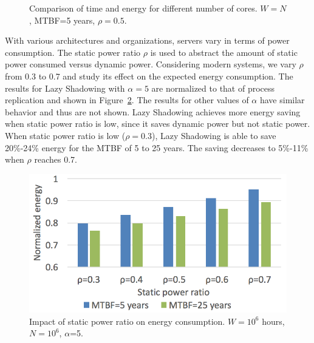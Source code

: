 \begin{figure}[!t]
	\captionsetup{justification=centering}
	\begin{center}
	\end{center}
	\caption{Comparison of time and energy for different number of cores. $W=N$, MTBF=5 years, $\rho=0.5$.}
	\label{fig:n5}
\end{figure}

With various architectures and organizations, servers
vary in terms of
power consumption. The static power ratio $\rho$ is used to abstract the
amount of static power consumed versus dynamic power. 
Considering modern systems, we vary $\rho$ from 0.3 to 0.7 and study its effect
on the expected energy consumption. The results for Lazy Shadowing with $\alpha=5$ are normalized to that of process replication and shown in 
Figure~\ref{fig:power_ratio}. The results for other values of $\alpha$ have similar behavior and thus are not shown. Lazy Shadowing achieves
more energy saving when static power ratio is low, since it saves dynamic 
power but not static power. When static power ratio is low ($\rho=0.3$), Lazy Shadowing
is able to save 20\%-24\% energy for the MTBF of 5 to 25 years. The saving decreases to 5\%-11\% when $\rho$ reaches 0.7. 

\begin{figure}[!t]
	\captionsetup{justification=centering}
	\begin{center}
		\includegraphics[width=0.7\columnwidth]{figures/ts_power_5}
	\end{center}
	\caption{Impact of static power ratio on energy consumption. $W=10^6$ hours, $N=10^6$, $\alpha$=5.}
	\label{fig:power_ratio}
\end{figure}

